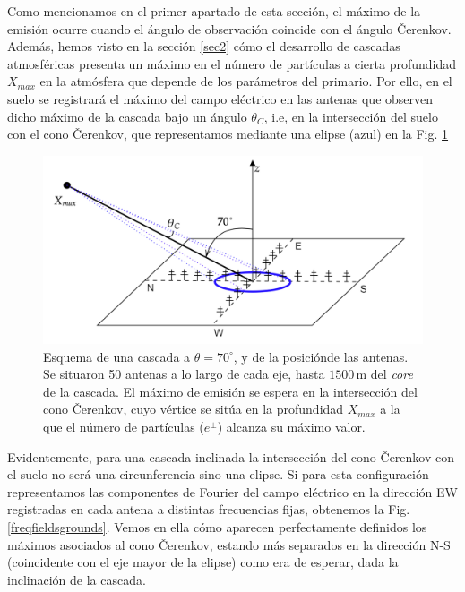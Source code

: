 \documentclass[11 pt, a4paper]{article} %
\numberwithin{equation}{section}
\numberwithin{figure}{section}
\numberwithin{table}{section}
\begin{document}
Como mencionamos en el primer apartado de esta sección, el máximo de la emisión ocurre cuando el ángulo de observación coincide con el ángulo \v{C}erenkov. Además, hemos visto en la sección \ref{sec2} cómo el desarrollo de cascadas atmosféricas presenta un máximo en el número de partículas a cierta profundidad $X_{max}$ en la atmósfera que depende de los parámetros del primario. Por ello, en el suelo se registrará el máximo del campo eléctrico en las antenas que observen dicho máximo de la cascada bajo un ángulo $\theta_C$, i.e, en la intersección del suelo con el cono \v{C}erenkov, que representamos mediante una elipse (azul) en la Fig. \ref{ANITApaper_showscheme}
\begin{figure}[H]
	\centering
	\includegraphics[width=.75\linewidth]{figures/radio/ANITApaper_showscheme}
	\caption{Esquema de una cascada a $\theta=70^\circ$, y de la posiciónde las antenas. Se situaron 50 antenas a lo largo de cada eje, hasta $1500\,\mathrm{m}$ del \textit{core} de la cascada. El máximo de emisión se espera en la intersección del cono \v{C}erenkov, cuyo vértice se sitúa en la profundidad $X_{max}$ a la que el número de partículas ($e^\pm$) alcanza su máximo valor.}
	\label{ANITApaper_showscheme}
\end{figure}

Evidentemente, para una cascada inclinada la intersección del cono \v{C}erenkov con el suelo no será una circunferencia sino una elipse. Si para esta configuración representamos las componentes de Fourier del campo eléctrico en la dirección EW registradas en cada antena a distintas frecuencias fijas, obtenemos la Fig. \ref{freqfieldsgrounds}. Vemos en ella cómo aparecen perfectamente definidos los máximos asociados al cono \v{C}erenkov, estando más separados en la dirección N-S (coincidente con el eje mayor de la elipse) como era de esperar, dada la inclinación de la cascada.
\end{document}
